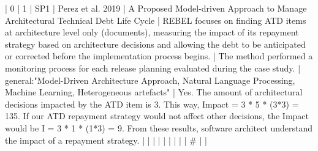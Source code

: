 |  0 |          1 | SP1  | Perez et al. 2019                                                    | A Proposed Model-driven Approach to Manage Architectural Technical Debt Life Cycle                                                                                       | REBEL focuses on finding ATD items at architecture level only (documents), measuring the impact of its repayment strategy based on architecture decisions and allowing the debt to be anticipated or corrected before the implementation process begins. | The method performed a monitoring process for each release planning evaluated during the case study.                                                                                                                                                               | general:"Model-Driven Architecture Approach, Natural Language Processing, Machine Learning, Heterogeneous artefacts"                                                                                                                                                                                     | Yes. The amount of architectural decisions impacted by the ATD item is 3. This way, Impact = 3 * 5 * (3*3) = 135. If our ATD repayment strategy would not affect other decisions, the Impact would be I = 3 * 1 * (1*3) = 9. From these results, software architect understand the impact of a repayment strategy.                                                                                                                                                                       |
|    |            |      |                                                                      |                                                                                                                                                                          |                                                                                                                                                                                                                                                            |                                                                                                                                                                                                                                                                      | #                                                                                                                                                                                                                                                                                                        |                                                                                                                                                                                                                                                                                                                                                                                                                                                                                              |
